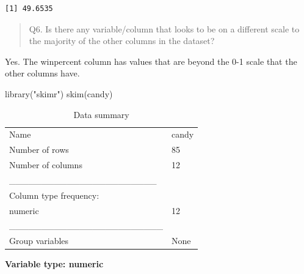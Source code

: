 \documentclass[
  letterpaper,
  DIV=11,
  numbers=noendperiod]{scrartcl}
\newenvironment{Shaded}{\begin{snugshade}}{\end{snugshade}}
\newcommand{\FunctionTok}[1]{\textcolor[rgb]{0.28,0.35,0.67}{#1}}
\newcommand{\NormalTok}[1]{\textcolor[rgb]{0.00,0.23,0.31}{#1}}
\newcommand{\StringTok}[1]{\textcolor[rgb]{0.13,0.47,0.30}{#1}}
\begin{document}
\begin{verbatim}
[1] 49.6535
\end{verbatim}

\begin{quote}
Q6. Is there any variable/column that looks to be on a different scale
to the majority of the other columns in the dataset?
\end{quote}

Yes. The winpercent column has values that are beyond the 0-1 scale that
the other columns have.

\begin{Shaded}
\begin{Highlighting}[]
\FunctionTok{library}\NormalTok{(}\StringTok{"skimr"}\NormalTok{)}
\FunctionTok{skim}\NormalTok{(candy)}
\end{Highlighting}
\end{Shaded}

\begin{longtable}[]{@{}ll@{}}
\caption{Data summary}\tabularnewline
\toprule\noalign{}
\endfirsthead
\endhead
\bottomrule\noalign{}
\endlastfoot
Name & candy \\
Number of rows & 85 \\
Number of columns & 12 \\
\_\_\_\_\_\_\_\_\_\_\_\_\_\_\_\_\_\_\_\_\_\_\_ & \\
Column type frequency: & \\
numeric & 12 \\
\_\_\_\_\_\_\_\_\_\_\_\_\_\_\_\_\_\_\_\_\_\_\_\_ & \\
Group variables & None \\
\end{longtable}

\textbf{Variable type: numeric}
\end{document}
